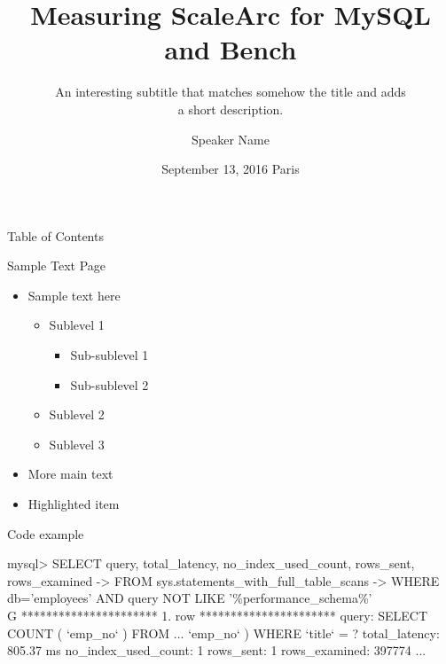 \documentclass[aspectratio=169]{beamer}
\title[Percona Common Template v.2016]{Measuring ScaleArc for MySQL and Bench}
\subtitle{An interesting subtitle that matches somehow the title and adds\\a short description.}
\author{Speaker Name}
\date{September 13, 2016 Paris}
\begin{document}
        \begin{frame}
                \titlepage
        \end{frame}

	
		\begin{frame}{Table of Contents}
			\vfill
			\tableofcontents
		\end{frame}
		
        \begin{frame}{Sample Text Page}
                \begin{itemize}
                        \item Sample text here
                        \begin{itemize}
                                \item Sublevel 1
                                \begin{itemize}
                                	\item Sub-sublevel 1
                                	\item Sub-sublevel 2
                                \end{itemize}
                                \item Sublevel 2
                                \item Sublevel 3
                        \end{itemize}
                        \item More main text
                        \item \alert{Highlighted item}
                \end{itemize}
        \end{frame}
		
		\begin{frame}[fragile]{Code example}
			\begin{semiverbatim}
				mysql> SELECT query, total_latency, no_index_used_count, rows_sent, rows_examined
				    -> FROM sys.statements_with_full_table_scans 
				    -> WHERE db='employees' AND query NOT LIKE '\%performance_schema\%'\\G
				********************** 1. row **********************
				              query: SELECT COUNT ( `emp_no` ) FROM ...  `emp_no` ) WHERE `title` = ?
				      total_latency: 805.37 ms
				no_index_used_count: 1
				          rows_sent: 1
				      rows_examined: 397774
				...
			\end{semiverbatim}
		\end{frame}
		
\end{document}
